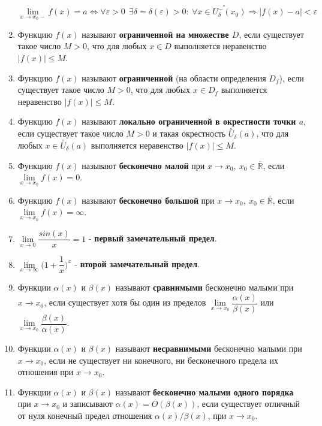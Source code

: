 \begin{enumerate}
$$\lim\limits_{x \to x_0 -} f(x) = a \iff \forall{\varepsilon} > 0 \ \ \exists \delta = \delta({\varepsilon}) > 0 : \ \forall x \in {\overset{\circ\hspace{22pt}}{U^-_\delta(x_0)}}  \Rightarrow | f(x) - a|  < {\varepsilon}
    $$
\item Функцию $f(x)$ называют \textbf{ограниченной на множестве $D$}, если существует такое число $M > 0$, что для любых $x \in D$ выполняется неравенство $\mid  f(x)\mid   \leqslant M$.
\item Функцию $f(x)$ называют \textbf{ограниченной} (на области определения $D_f$), если существует такое число $M > 0$, что для любых $x \in D_f$ выполняется неравенство $\mid  f(x)\mid   \leqslant M$.
\item Функцию $f(x)$ называют \textbf{локально ограниченной в окрестности точки $a$}, если существует такое число $M > 0$ и такая окрестность $\overset{\circ}U_\delta(a)$, что для любых $x \in \overset{\circ}U_\delta(a)$ выполняется неравенство $\mid  f(x)\mid   \leqslant M$.
\item Функцию $f(x)$ называют \textbf{бесконечно малой} при $x \rightarrow x_0, \ x_0 \in \overline{\mathbb{R}}$, если $\lim\limits_{x \to x_0} f(x) = 0$.
\item Функцию $f(x)$ называют \textbf{бесконечно большой} при $x \rightarrow x_0, \ x_0 \in \overline{\mathbb{R}}$, если $\lim\limits_{x \to x_0} f(x) = \infty$.
\item $\lim\limits_{x \to 0} {\dfrac{sin(x)}{x}} = 1$ - \textbf{первый замечательный предел}.
\item $\lim\limits_{x \to \infty} \bigg(1 + {\dfrac{1}{x}}\bigg)^{ x}$ - \textbf{второй замечательный предел}.
\item Функции $\alpha(x)$ и $\beta(x)$ называют \textbf{сравнимыми} бесконечно малыми при $x \rightarrow x_0$, если существует хотя бы один из пределов $\lim\limits_{x \to x_0} { \dfrac{\alpha(x)}{\beta(x)}}$ или $\lim\limits_{x \to x_0} { \dfrac{\beta(x)}{\alpha(x)}}$.
\item Функции $\alpha(x)$ и $\beta(x)$ называют \textbf{несравнимыми} бесконечно малыми при $x \rightarrow x_0$, если не существует ни конечного, ни бесконечного предела их отношения при $x \rightarrow x_0$.
\item Функции $\alpha(x)$ и $\beta(x)$ называют \textbf{бесконечно малыми одного порядка} при $x \rightarrow x_0$ и записывают $\alpha(x) = O(\beta(x))$, если существует отличный от нуля конечный предел отношения $\alpha(x)/\beta(x)$, при $x \rightarrow x_0$.


\end{enumerate}
